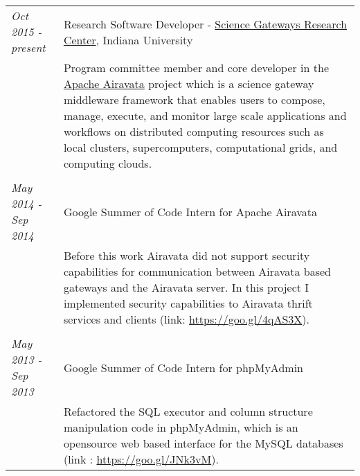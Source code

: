 \documentclass[a4paper,10pt]{article}
\begin{document}
\begin{tabular}{p{3cm}|p{13.5cm}}

\emph{Oct 2015 - present}& Research Software Developer - \href{https://sgrc.iu.edu}{Science Gateways Research Center}, Indiana University\\
&\footnotesize{Program committee member and core developer in the \href{https://goo.gl/s9Gm3k}{Apache Airavata} project which is a science gateway middleware framework that enables users to compose, manage, execute, and monitor large scale applications and workflows on distributed computing resources such as local clusters, supercomputers, computational grids, and computing clouds.}\\\\

\emph{May 2014 - Sep 2014}& Google Summer of Code Intern for Apache Airavata\\
&\footnotesize{Before this work Airavata did not support security capabilities for communication between Airavata based gateways and the Airavata server. In this project I implemented security capabilities to Airavata thrift services and clients (link: \url{https://goo.gl/4qAS3X}).}\\\\


\emph{May 2013 - Sep 2013} & Google Summer of Code Intern for phpMyAdmin 
\\&\footnotesize{Refactored the SQL executor and column structure manipulation code in phpMyAdmin, which is an opensource web based interface for the MySQL databases (link : \url{https://goo.gl/JNk3vM}).}
\end{tabular}


\end{document}
